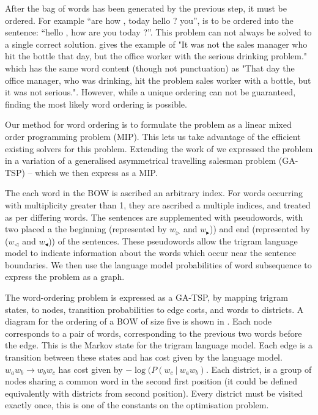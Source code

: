 \documentclass[11pt]{article}
\theoremstyle{plain}
\theoremstyle{definition}
\begin{document}
After the bag of words has been generated by the previous step, it must be ordered. For example “are how , today hello ? you”, is to be ordered into the sentence: “hello , how are you today ?”. This problem can not always be solved to a single correct solution. \textcite{Mitchell2008}  gives the example of "It was not the sales manager who hit the bottle that day, but the office worker with the serious drinking problem." which has the same word content (though not punctuation) as "That day the office manager, who was drinking, hit the problem sales worker with a bottle, but it was not serious.". However, while a unique ordering can not be guaranteed, finding the most likely word ordering is possible.

Our method for word ordering is to formulate the problem as a linear mixed order programming problem (MIP). This lets us take advantage of the efficient existing solvers for this problem. Extending the work of \textcite{Horvat2014} we expressed the problem in a variation of a generalised asymmetrical travelling salesman problem (GA-TSP) -- which we then express as a MIP. 

The each word in the BOW is ascribed an arbitrary index. For words occurring with multiplicity greater than 1, they are ascribed a multiple indices, and treated as per differing words. The sentences are supplemented with pseudowords, with two placed a the beginning (represented by $w_\triangleright$ and $w_\blacktriangleright$)) and end (represented by ($w_\triangleleft$ and $w_\blacktriangleleft$)) of the sentences. These pseudowords allow the trigram language model to indicate information about the words which occur near the sentence boundaries. We then use the language model probabilities of word subsequence to express the problem as a graph.

The word-ordering problem is expressed as a GA-TSP, by mapping trigram states, to nodes, transition probabilities to edge costs, and words to districts. A diagram for the ordering of a BOW of size five is shown in . Each node corresponds to a pair of words, corresponding to the previous two words before the edge. This is the Markov state for the trigram language model. Each edge is a transition between these states and has cost given by the language model. $w_aw_b\to w_bw_c$ has cost given by $-\log(P(w_c\:|\:w_aw_b)$. Each district, is a group of nodes sharing a common word in the second first position (it could be defined equivalently with districts from second position). Every district must be visited exactly once, this is one of the constants on the optimisation problem.
\end{document}
